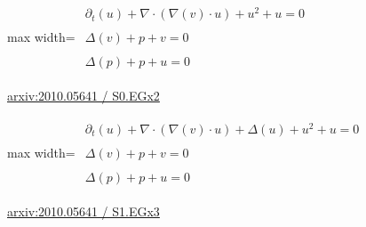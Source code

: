 \documentclass[10pt,a4paper]{article}
\begin{document}
\begin{minipage}{\linewidth}
\begin{center}\begin{adjustbox}{max width=\linewidth}$\displaystyle\begin{gathered}\begin{gathered}\partial_{t}(u)+\nabla\cdot(\nabla(v)\cdot u)+u^{2}+u=0\end{gathered}\\[5pt]\begin{gathered}\Delta(v)+p+v=0\end{gathered}\\[5pt]\begin{gathered}\Delta(p)+p+u=0\end{gathered}\end{gathered}$\end{adjustbox}\end{center}
{\small \href{https://arxiv.org/html/2010.05641#S0.EGx2}{arxiv:2010.05641 / S0.EGx2}}\par
\end{minipage}\par\vspace{7mm}

\begin{minipage}{\linewidth}
\begin{center}\begin{adjustbox}{max width=\linewidth}$\displaystyle\begin{gathered}\begin{gathered}\partial_{t}(u)+\nabla\cdot(\nabla(v)\cdot u)+\Delta(u)+u^{2}+u=0\end{gathered}\\[5pt]\begin{gathered}\Delta(v)+p+v=0\end{gathered}\\[5pt]\begin{gathered}\Delta(p)+p+u=0\end{gathered}\end{gathered}$\end{adjustbox}\end{center}
{\small \href{https://arxiv.org/html/2010.05641#S1.EGx3}{arxiv:2010.05641 / S1.EGx3}}\par
\end{minipage}\par\vspace{7mm}
\end{document}
